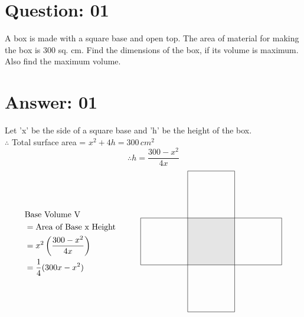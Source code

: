 \documentclass[17pt]{extarticle}
\begin{document}
\noindent
\begin{fleqn} 


\section{Question: 01}
A box is made with a square base and open top. The area of material for making the box is 300 sq. cm. Find the dimensions of the box, if its volume is maximum. Also find the maximum volume.



\section{Answer: 01}


Let  'x'  be the side of a square base and  'h' be the height of the box.\\
$\therefore$ Total surface area = $x^2+4h = 300\,cm^2$
\[\therefore h = \frac{300 - x^2}{4x}\]
\begin{equation} \nonumber
\begin{alignedat}{4}
\hspace{0em}&\hspace{-0em}\text{Base Volume V}\\
&= \text{Area of Base x Height}\\
&= x^2\left(\frac{300-x^2}{4x}\right)\\
&= \frac{1}{4}(300x - x^2)
\end{alignedat}
\quad\quad\quad
\begin{alignedat}{4}
\begin{tikzpicture}
\draw (0,0) -- (0,2) -- (2,2) -- (2,4) -- (4,4) -- (4,2) -- (6,2) -- (6,0) -- (4,0) -- (4,-2) -- (2,-2) -- (2,0) -- (0,0) ; 
\filldraw[fill=gray!20] (2,0) rectangle (4,2);
\end{tikzpicture}
\end{alignedat}
\end{equation}
\quad



\end{fleqn}
\end{document}
